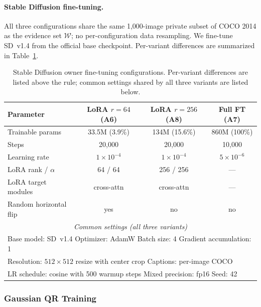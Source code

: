 \documentclass{article}
\begin{document}
\paragraph{Stable Diffusion fine-tuning.}
All three configurations share the same 1{,}000-image private subset of COCO 2014 as the evidence set $\mathcal{W}$; no per-configuration data resampling. We fine-tune SD~v1.4 from the official base checkpoint. Per-variant differences are summarized in Table~\ref{tab:hyperparams_sd}.

\begin{table}[!htbp]
\caption{Stable Diffusion owner fine-tuning configurations. Per-variant differences are listed above the rule; common settings shared by all three variants are listed below.}
\label{tab:hyperparams_sd}
\centering
\begin{small}
\begin{tabular}{@{}lccc@{}}
\toprule
Parameter & LoRA $r{=}64$ (A6) & LoRA $r{=}256$ (A8) & Full FT (A7) \\
\midrule
Trainable params       & 33.5M (3.9\%)     & 134M (15.6\%)     & 860M (100\%) \\
Steps                  & 20{,}000          & 20{,}000          & 10{,}000 \\
Learning rate          & $1{\times}10^{-4}$ & $1{\times}10^{-4}$ & $5{\times}10^{-6}$ \\
LoRA rank / $\alpha$   & 64 / 64           & 256 / 256         & --- \\
LoRA target modules    & cross-attn        & cross-attn        & --- \\
Random horizontal flip & yes               & no                & no \\
\midrule
\multicolumn{4}{c}{\textit{Common settings (all three variants)}} \\
\multicolumn{4}{l}{Base model: SD~v1.4 \quad Optimizer: AdamW \quad Batch size: 4 \quad Gradient accumulation: 1} \\
\multicolumn{4}{l}{Resolution: $512{\times}512$ resize with center crop \quad Captions: per-image COCO} \\
\multicolumn{4}{l}{LR schedule: cosine with 500 warmup steps \quad Mixed precision: fp16 \quad Seed: 42} \\
\bottomrule
\end{tabular}
\end{small}
\end{table}

\subsubsection{Gaussian QR Training}
\end{document}
